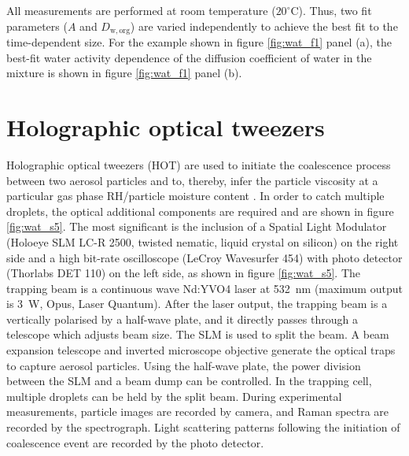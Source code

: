All measurements are performed at room temperature ($\num{20}^{\circ}\mathrm{C}$). Thus, two fit parameters ($A$ and $D_{\mathrm{w,org}}$) are varied independently to achieve the best fit to the time-dependent size. For the example shown in figure \ref{fig:wat_f1} panel (a), the best-fit water activity dependence of the diffusion coefficient of water in the mixture is shown in figure \ref{fig:wat_f1} panel (b). 

\section{Holographic optical tweezers}
Holographic optical tweezers (HOT) are used to initiate the coalescence process between two aerosol particles and to, thereby, infer the particle viscosity at a particular gas phase RH/particle moisture content \cite{Song2016a}. In order to catch multiple droplets, the optical additional components are required and are shown in figure \ref{fig:wat_s5}. The most significant is the inclusion of a Spatial Light Modulator (Holoeye SLM LC-R 2500, twisted nematic, liquid crystal on silicon) on the right side and a high bit-rate oscilloscope (LeCroy Wavesurfer 454) with photo detector (Thorlabs DET 110) on the left side, as shown in figure \ref{fig:wat_s5}. The trapping beam is a continuous wave Nd:YVO4 laser at \SI{532}{\nano\meter} (maximum output is \SI{3}{\watt}, Opus, Laser Quantum). After the laser output, the trapping beam is a vertically polarised by a half-wave plate, and it directly passes through a telescope which adjusts beam size. The SLM is used to split the beam. A beam expansion telescope and inverted microscope objective generate the optical traps to capture aerosol particles. Using the half-wave plate, the power division between the SLM and a beam dump can be controlled. In the trapping cell, multiple droplets can be held by the split beam. During experimental measurements, particle images are recorded by camera, and Raman spectra are recorded by the spectrograph. Light scattering patterns following the initiation of coalescence event are recorded by the photo detector.

